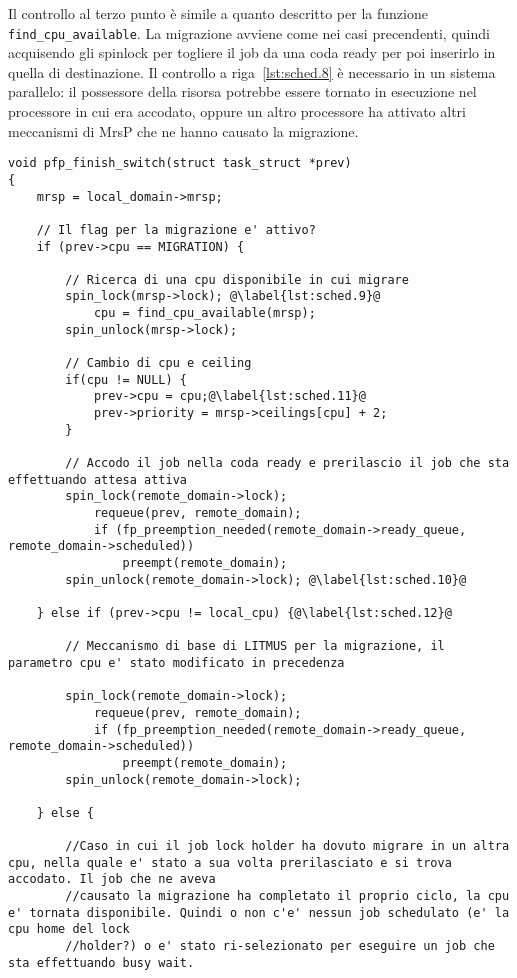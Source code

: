 Il controllo al terzo punto è simile a quanto descritto per la funzione \texttt{find\_cpu\_available}. La migrazione avviene come nei casi precendenti, quindi acquisendo gli spinlock per togliere il job da una coda ready per poi inserirlo in quella di destinazione. Il controllo a riga~\ref{lst:sched.8} è necessario in un sistema parallelo: il possessore della risorsa potrebbe essere tornato in esecuzione nel processore in cui era accodato, oppure un altro processore ha attivato altri meccanismi di MrsP che ne hanno causato la migrazione.\\

\begin{lstlisting}
void pfp_finish_switch(struct task_struct *prev)
{
	mrsp = local_domain->mrsp;

	// Il flag per la migrazione e' attivo?
	if (prev->cpu == MIGRATION) {

		// Ricerca di una cpu disponibile in cui migrare
		spin_lock(mrsp->lock); @\label{lst:sched.9}@
			cpu = find_cpu_available(mrsp);
		spin_unlock(mrsp->lock);
	
		// Cambio di cpu e ceiling
		if(cpu != NULL) {
			prev->cpu = cpu;@\label{lst:sched.11}@
			prev->priority = mrsp->ceilings[cpu] + 2;
		}

		// Accodo il job nella coda ready e prerilascio il job che sta effettuando attesa attiva
		spin_lock(remote_domain->lock);
			requeue(prev, remote_domain);
			if (fp_preemption_needed(remote_domain->ready_queue, remote_domain->scheduled))
				preempt(remote_domain);
		spin_unlock(remote_domain->lock); @\label{lst:sched.10}@

	} else if (prev->cpu != local_cpu) {@\label{lst:sched.12}@

		// Meccanismo di base di LITMUS per la migrazione, il parametro cpu e' stato modificato in precedenza

		spin_lock(remote_domain->lock);
			requeue(prev, remote_domain);
			if (fp_preemption_needed(remote_domain->ready_queue, remote_domain->scheduled))
				preempt(remote_domain);
		spin_unlock(remote_domain->lock);

	} else {
	
		//Caso in cui il job lock holder ha dovuto migrare in un altra cpu, nella quale e' stato a sua volta prerilasciato e si trova accodato. Il job che ne aveva
		//causato la migrazione ha completato il proprio ciclo, la cpu e' tornata disponibile. Quindi o non c'e' nessun job schedulato (e' la cpu home del lock
		//holder?) o e' stato ri-selezionato per eseguire un job che sta effettuando busy wait.
		

\end{lstlisting}
